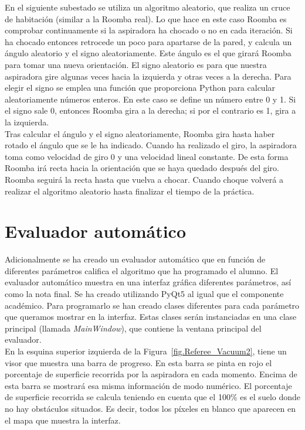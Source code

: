 En el siguiente subestado se utiliza un algoritmo aleatorio, que realiza un cruce de habitación (similar a la Roomba real). Lo que hace en este caso Roomba es comprobar continuamente si la aspiradora ha chocado o no en cada iteración. Si ha chocado entonces retrocede un poco para apartarse de la pared, y calcula un ángulo aleatorio y el signo aleatoriamente. Este ángulo es el que girará Roomba para tomar una nueva orientación. El signo aleatorio es para que nuestra aspiradora gire algunas veces hacia la izquierda y otras veces a la derecha. Para elegir el signo se emplea una función que proporciona Python para calcular aleatoriamente números enteros. En este caso se define un número entre 0 y 1. Si el signo sale 0, entonces Roomba gira a la derecha; si por el contrario es 1, gira a la izquierda.\\

Tras calcular el ángulo y el signo aleatoriamente, Roomba gira hasta haber rotado el ángulo que se le ha indicado. Cuando ha realizado el giro, la aspiradora toma como velocidad de giro 0 y una velocidad lineal constante. De esta forma Roomba irá recta hacia la orientación que se haya quedado después del giro. Roomba seguirá la recta hasta que vuelva a chocar. Cuando choque volverá a realizar el algoritmo aleatorio hasta finalizar el tiempo de la práctica.\\


\section{Evaluador automático}
Adicionalmente se ha creado un evaluador automático que en función de diferentes parámetros califica el algoritmo que ha programado el alumno. El evaluador automático muestra en una interfaz gráfica diferentes parámetros, así como la nota final. Se ha creado utilizando PyQt5 al igual que el componente académico. Para programarlo se han creado clases diferentes para cada parámetro que queramos mostrar en la interfaz. Estas clases serán instanciadas en una clase principal (llamada \textit{MainWindow}), que contiene la ventana principal del evaluador.\\

En la esquina superior izquierda de la Figura~\ref{fig.Referee_Vacuum2}, tiene un visor que muestra una barra de progreso. En esta barra se pinta en rojo el porcentaje de superficie recorrida por la aspiradora en cada momento. Encima de esta barra se mostrará esa misma información de modo numérico. El porcentaje de superficie recorrida se calcula teniendo en cuenta que el 100\% es el suelo donde no hay obstáculos situados. Es decir, todos los píxeles en blanco que aparecen en el mapa que muestra la interfaz.\\

